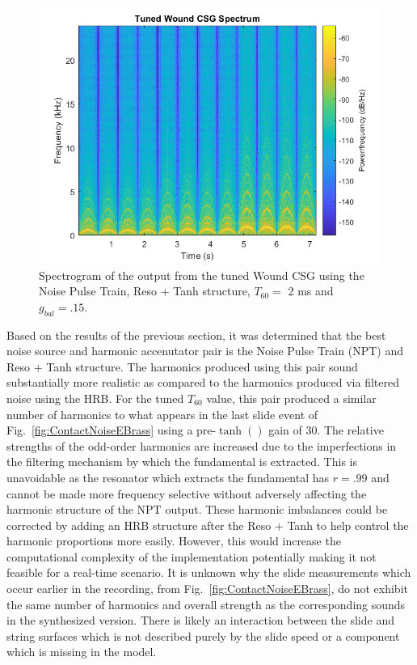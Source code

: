 \documentclass[../main.tex]{subfiles}
\begin{document}
\begin{figure}[h]
    \centering
    \includegraphics[scale=.65]{./images/plots/TunedWoundCSG.png}
    \caption{Spectrogram of the output from the tuned Wound CSG using the Noise Pulse Train, Reso + Tanh structure, $T_{60} = $ 2 ms and $g_{bal} = .15$.}
    \label{fig:TunedWoundCSG}
\end{figure}

Based on the results of the previous section, it was determined that the best noise source and harmonic accenutator pair is the Noise Pulse Train (NPT) and Reso + Tanh structure. The harmonics produced using this pair sound substantially more realistic as compared to the harmonics produced via filtered noise using the HRB. For the tuned $T_{60}$ value, this pair produced a similar number of harmonics to what appears in the last slide event of Fig.~\ref{fig:ContactNoiseEBrass} using a pre-$\tanh()$ gain of 30. The relative strengths of the odd-order harmonics are increased due to the imperfections in the filtering mechanism by which the fundamental is extracted. This is unavoidable as the resonator which extracts the fundamental has $r = .99$ and cannot be made more frequency selective without adversely affecting the harmonic structure of the NPT output. These harmonic imbalances could be corrected by adding an HRB structure after the Reso + Tanh to help control the harmonic proportions more easily. However, this would increase the computational complexity of the implementation potentially making it not feasible for a real-time scenario. It is unknown why the slide measurements which occur earlier in the recording, from Fig.~\ref{fig:ContactNoiseEBrass}, do not exhibit the same number of harmonics and overall strength as the corresponding sounds in the synthesized version. There is likely an interaction between the slide and string surfaces which is not described purely by the slide speed or a component which is missing in the model.
\end{document}
